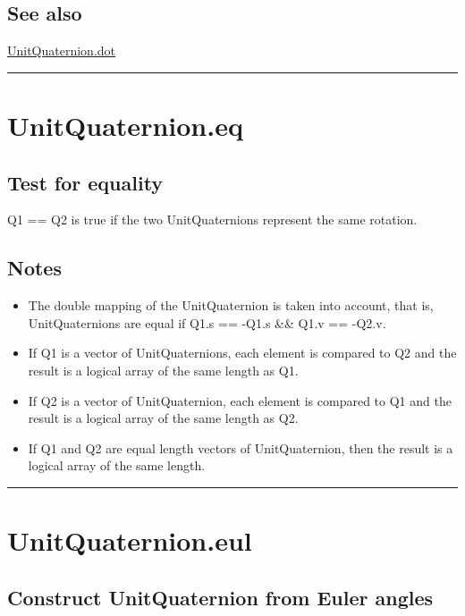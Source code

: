 \subsection*{See also}


\hyperlink{UnitQuaternion.dot}{\color{blue} UnitQuaternion.dot}

\vspace{1.5ex}\hrule

\hypertarget{UnitQuaternion.eq}{\section*{UnitQuaternion.eq}}
\subsection*{Test for equality}


Q1 == Q2 is true if the two UnitQuaternions represent the same rotation.


\subsection*{Notes}
\begin{itemize}
  \item The double mapping of the UnitQuaternion is taken into account, that is,    UnitQuaternions are equal if Q1.s == -Q1.s \&\& Q1.v == -Q2.v.
  \item If Q1 is a vector of UnitQuaternions, each element is compared to    Q2 and the result is a logical array of the same length as Q1.
  \item If Q2 is a vector of UnitQuaternion, each element is compared to    Q1 and the result is a logical array of the same length as Q2.
  \item If Q1 and Q2 are equal length vectors of UnitQuaternion, then the result    is a logical array of the same length.
\end{itemize}
\vspace{1.5ex}\hrule

\hypertarget{UnitQuaternion.eul}{\section*{UnitQuaternion.eul}}
\subsection*{Construct UnitQuaternion from Euler angles}


